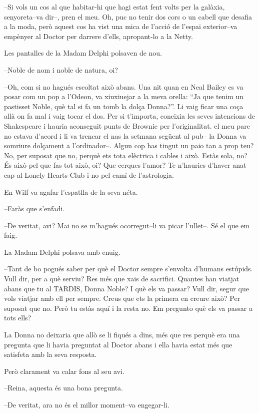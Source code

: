 --Si vols un cos al que habitar-hi que hagi estat fent volts per la
galàxia, senyoreta--va dir--, pren el meu. Oh, puc no tenir dos cors o
un cabell que desafia a la moda, però aquest cos ha vist una mica de
l'acció de l'espai exterior--va empènyer al Doctor per darrere d'ells,
apropant-lo a la Netty.

Les pantalles de la Madam Delphi polsaven de nou.

--Noble de nom i noble de natura, oi?

--Oh, com si no hagués escoltat això abans. Una nit quan en Neal Bailey
es va posar com un pop a l'Odeon, va xiuxiuejar a la meva orella: ``Ja
que tenim un pastisset Noble, què tal si fa un tomb la dolça Donna?''.
Li vaig ficar una coça allà on fa mal i vaig tocar el dos. Per si
t'importa, coneixia les seves intencions de Shakespeare i hauria
aconseguit punts de Brownie per l'originalitat. el meu pare no estava
d'acord i li va trencar el nas la setmana següent al pub-- la Donna va
somriure dolçament a l'ordinador--. Algun cop has tingut un paio tan a
prop teu? No, per suposat que no, perquè ets tota elèctrica i cables i
això. Estàs sola, no? És això pel que fas tot això, oi? Que cerques
l'amor? Te n'hauries d'haver anat cap al Lonely Hearts Club i no pel
camí de l'astrologia.

En Wilf va agafar l'espatlla de la seva néta.

--Faràs que s'enfadi.

--De veritat, avi? Mai no se m'hagués ocorregut--li va picar l'ullet--.
Sé el que em faig.

La Madam Delphi polsava amb enuig.

--Tant de bo pogués saber per què el Doctor sempre s'envolta d'humans
estúpids. Vull dir, per a què serviu? Res més que xais de sacrifici.
Quantes han viatjat abans que tu al TARDIS, Donna Noble? I què els va
passar? Vull dir, segur que vols viatjar amb ell per sempre. Creus que
ets la primera en creure això? Per suposat que no. Però tu estàs aquí i
la resta no. Em pregunto què els va passar a tots ells?

La Donna no deixaria que allò se li fiqués a dins, més que res perquè
era una pregunta que li havia preguntat al Doctor abans i ella havia
estat més que satisfeta amb la seva resposta.

Però clarament va calar fons al seu avi.

--Reina, aquesta és una bona pregunta.

--De veritat, ara no és el millor moment--va engegar-li.

